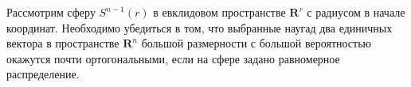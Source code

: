 \begin{comment}
\subsection {Примеры явления концентрации меры}

\begin{problem}[Концентрация объема шара] 
Рассмотрим шар $B^{n}(r)$ радиуса $r$ в евклидовом пространстве $\mathbf{R}^n$ большой размерности, пусть в шаре задана равномерная мера. 
 Необходимо убедиться в том, что мера сконцентрирована в малой окрестности  границы шара.
Рассмотреть также единичный куб.
\end{problem}

\end{comment}

\begin{problem}

Рассмотрим сферу $S^{n-1}(r)$ в евклидовом пространстве $\mathbf{R}^r$ с радиусом в начале координат. Необходимо убедиться в том, что выбранные наугад два единичных вектора в пространстве $\mathbf{R}^n$ большой размерности с большой вероятностью окажутся почти ортогональными, если на сфере задано равномерное распределение.  
\end{problem}



